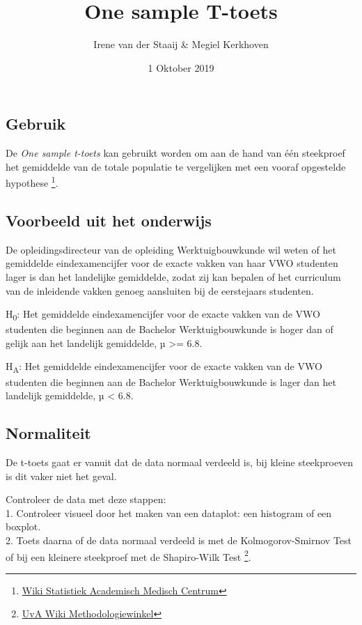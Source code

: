 \documentclass[]{article}
\title{One sample T-toets}
\author{Irene van der Staaij \& Megiel Kerkhoven}
\date{1 Oktober 2019}
\let\rmarkdownfootnote\footnote%
\def\footnote{\protect\rmarkdownfootnote}
\begin{document}
\maketitle

{
\setcounter{tocdepth}{2}
\tableofcontents
}
\hypertarget{gebruik}{%
\subsection{Gebruik}\label{gebruik}}

De \emph{One sample t-toets} kan gebruikt worden om aan de hand van één
steekproef het gemiddelde van de totale populatie te vergelijken met een
vooraf opgestelde hypothese \footnote{\href{https://wikistatistiek.amc.nl/index.php/T-toets\#one_sample_t-toets}{Wiki
  Statistiek Academisch Medisch Centrum}}.

\hypertarget{voorbeeld-uit-het-onderwijs}{%
\subsection{Voorbeeld uit het
onderwijs}\label{voorbeeld-uit-het-onderwijs}}

De opleidingsdirecteur van de opleiding Werktuigbouwkunde wil weten of
het gemiddelde eindexamencijfer voor de exacte vakken van haar VWO
studenten lager is dan het landelijke gemiddelde, zodat zij kan bepalen
of het curriculum van de inleidende vakken genoeg aansluiten bij de
eerstejaars studenten.

H\textsubscript{0}: Het gemiddelde eindexamencijfer voor de exacte
vakken van de VWO studenten die beginnen aan de Bachelor
Werktuigbouwkunde is hoger dan of gelijk aan het landelijk gemiddelde, µ
\textgreater= 6.8.

H\textsubscript{A}: Het gemiddelde eindexamencijfer voor de exacte
vakken van de VWO studenten die beginnen aan de Bachelor
Werktuigbouwkunde is lager dan het landelijk gemiddelde, µ \textless{}
6.8.

\hypertarget{normaliteit}{%
\subsection{Normaliteit}\label{normaliteit}}

De t-toets gaat er vanuit dat de data normaal verdeeld is, bij kleine
steekproeven is dit vaker niet het geval.

Controleer de data met deze stappen:\\
1. Controleer visueel door het maken van een dataplot: een histogram of
een boxplot.\\
2. Toets daarna of de data normaal verdeeld is met de Kolmogorov-Smirnov
Test of bij een kleinere steekproef met de Shapiro-Wilk Test \footnote{\href{https://wiki.uva.nl/methodologiewinkel/index.php/Normaliteit}{UvA
  Wiki Methodologiewinkel}}.
\end{document}
